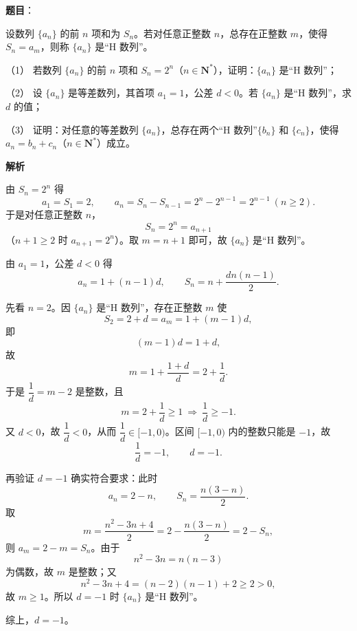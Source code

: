 \begin{answer}

\textbf{题目}：

设数列 $\{a_n\}$ 的前 $n$ 项和为 $S_n$。若对任意正整数 $n$，总存在正整数 $m$，使得 $S_n=a_m$，则称 $\{a_n\}$ 是“H 数列”。

（1） 若数列 $\{a_n\}$ 的前 $n$ 项和 $S_n=2^n$（$n\in\mathbf N^*$），证明：$\{a_n\}$ 是“H 数列”；

（2） 设 $\{a_n\}$ 是等差数列，其首项 $a_1=1$，公差 $d<0$。若 $\{a_n\}$ 是“H 数列”，求 $d$ 的值；

（3） 证明：对任意的等差数列 $\{a_n\}$，总存在两个“H 数列”$\{b_n\}$ 和 $\{c_n\}$，使得 $a_n=b_n+c_n$（$n\in\mathbf N^*$）成立。

\textbf{解析}


由 $S_n=2^n$ 得
\nopagebreak[4]
\[a_1=S_1=2,\qquad a_n=S_n-S_{n-1}=2^n-2^{n-1}=2^{n-1}\ (n\geqslant2).\]
于是对任意正整数 $n$，
\nopagebreak[4]
\[S_n=2^n=a_{n+1}\]
（$n+1\geqslant2$ 时 $a_{n+1}=2^n$）。取 $m=n+1$ 即可，故 $\{a_n\}$ 是“H 数列”。


由 $a_1=1$，公差 $d<0$ 得
\nopagebreak[4]
\[a_n=1+(n-1)d,\qquad S_n=n+\frac{dn(n-1)}2.\]

先看 $n=2$。因 $\{a_n\}$ 是“H 数列”，存在正整数 $m$ 使
\nopagebreak[4]
\[S_2=2+d=a_m=1+(m-1)d,\]
即
\nopagebreak[4]
\[(m-1)d=1+d,\]
故
\nopagebreak[4]
\[m=1+\frac{1+d}{d}=2+\frac1d.\]
于是 $\dfrac1d=m-2$ 是整数，且
\nopagebreak[4]
\[m=2+\frac1d\geqslant1\ \Longrightarrow\ \frac1d\geqslant-1.\]
又 $d<0$，故 $\dfrac1d<0$，从而 $\dfrac1d\in[-1,0)$。区间 $[-1,0)$ 内的整数只能是 $-1$，故
\nopagebreak[4]
\[\frac1d=-1,\qquad d=-1.\]

再验证 $d=-1$ 确实符合要求：此时
\nopagebreak[4]
\[a_n=2-n,\qquad S_n=\frac{n(3-n)}2.\]
取
\nopagebreak[4]
\[m=\frac{n^2-3n+4}2=2-\frac{n(3-n)}2=2-S_n,\]
则 $a_m=2-m=S_n$。由于
\nopagebreak[4]
\[n^2-3n=n(n-3)\]
为偶数，故 $m$ 是整数；又
\nopagebreak[4]
\[n^2-3n+4=(n-2)(n-1)+2\geqslant2>0,\]
故 $m\geqslant1$。所以 $d=-1$ 时 $\{a_n\}$ 是“H 数列”。

综上，$d=-1$。


\end{answer}
